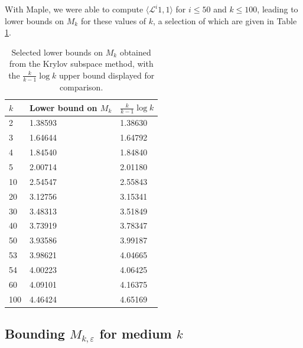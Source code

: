 \documentclass{bmcart}
\theoremstyle{plain}
\theoremstyle{definition}
\newcommand\eps{\varepsilon}
\begin{document}
With Maple, we were able to compute $\langle {\mathcal L}^i 1, 1 \rangle$ for $i \leq 50$ and $k \leq 100$, leading to lower bounds on $M_k$ for these values of $k$, a selection of which are given in Table \ref{tab}.

\begin{table}
\centering
 \caption{Selected lower bounds on $M_k$ obtained from the Krylov subspace method, with the $\frac{k}{k-1} \log k$ upper bound displayed for comparison.}
 \label{tab}
  \begin{tabular}{lll}
   \toprule
     $k$    & Lower bound on $M_k$   & $\frac{k}{k-1} \log k$   \\
   \midrule
           2 & 1.38593            & 1.38630                \\
           3 & 1.64644            & 1.64792              \\ [0.5ex]
           4 & 1.84540  	        & 1.84840             \\
           5 & 2.00714  	        & 2.01180             \\ [0.5ex]
          10 & 2.54547            & 2.55843              \\
				  20 & 3.12756            & 3.15341              \\  [0.5ex]
          30 & 3.48313            & 3.51849              \\
          40 & 3.73919            & 3.78347            \\  [0.5ex]
          50 & 3.93586            & 3.99187              \\
          53 & 3.98621            & 4.04665            \\  [0.5ex]
          54 & 4.00223            & 4.06425            \\
          60 & 4.09101            & 4.16375            \\  [0.5ex]
				 100 & 4.46424            & 4.65169           \\
   \bottomrule
  \end{tabular}
\end{table}


\subsection{Bounding \texorpdfstring{$M_{k,\eps}$}{Mk,epsilon} for medium \texorpdfstring{$k$}{k}}\label{mkeps-sec}
\end{document}
